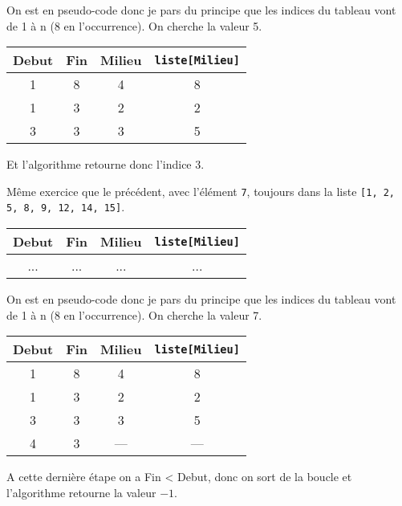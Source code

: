 \documentclass[12pt]{article}
\begin{document}
	\begin{MaReponse}
		On est en pseudo-code donc je pars du principe que les indices du tableau vont de 1 à n (8 en l'occurrence). On cherche la valeur 5.
		
		\begin{tabular}{|c|c|c|c|}
			\hline
			\textbf{Debut} & \textbf{Fin} & \textbf{Milieu} & \textbf{\texttt{liste[Milieu]}}\\
			\hline
			1 & 8 & 4 & 8\\
			\hline 
			1 & 3 & 2 & 2 \\
			\hline 
			3 & 3 & 3 & 5 \\
			\hline
		\end{tabular}
		
		Et l'algorithme retourne donc l'indice 3.
	\end{MaReponse}

	
	\begin{MonExo}
		Même exercice que le précédent, avec l'élément \texttt{7}, toujours dans la liste \texttt{[1, 2, 5, 8, 9, 12, 14, 15]}.
		
		\begin{tabular}{|c|c|c|c|}
			\hline
			\textbf{Debut} & \textbf{Fin} & \textbf{Milieu} & \textbf{\texttt{liste[Milieu]}}\\
			\hline
			... & ... & ... & ...\\
			\hline 
		\end{tabular}
	\end{MonExo}
	
		\begin{MaReponse}
		On est en pseudo-code donc je pars du principe que les indices du tableau vont de 1 à n (8 en l'occurrence). On cherche la valeur 7.
		
		\begin{tabular}{|c|c|c|c|}
			\hline
			\textbf{Debut} & \textbf{Fin} & \textbf{Milieu} & \textbf{\texttt{liste[Milieu]}}\\
			\hline
			1 & 8 & 4 & 8\\
			\hline 
			1 & 3 & 2 & 2 \\
			\hline 
			3 & 3 & 3 & 5 \\
			\hline
			4 & 3 & --- & --- \\
			\hline
		\end{tabular}
		
		A cette dernière étape on a Fin < Debut, donc on sort de la boucle et l'algorithme retourne  la valeur $-1$.
	\end{MaReponse}
	
\end{document}
